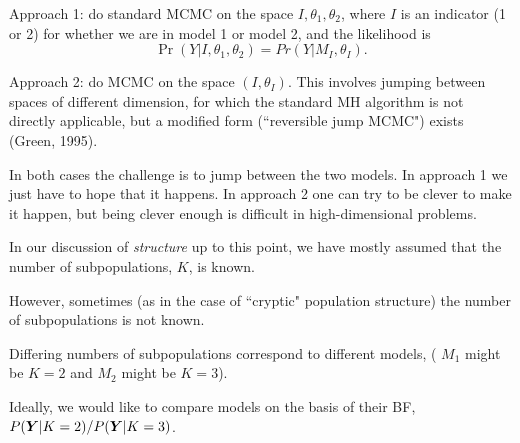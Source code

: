 
Approach 1: do standard MCMC on the space $I, \theta_1, \theta_2$, where $I$ is an indicator (1 or 2) for
whether we are in model 1 or model 2, and the likelihood is
$$\Pr(Y | I, \theta_1, \theta_2) = Pr(Y | M_I, \theta_I).$$
 
 Approach 2: do MCMC on the space $(I,\theta_I)$. This involves jumping between
 spaces of different dimension, for which the standard MH algorithm is not directly applicable,
 but a modified form (``reversible jump MCMC") exists (Green, 1995).
 
 In both cases the challenge is to jump between the two models. In approach 1 we just have
 to hope that it happens. In approach 2 one can try to be clever to make it happen, but being
 clever enough is difficult in high-dimensional problems.
 
In our discussion of {\em structure} up to this point, we have mostly assumed that the number of subpopulations, $K$, is known.  

However, sometimes (as in the case of ``cryptic" population structure) the number of subpopulations is not known.  

Differing numbers of subpopulations correspond to different models, (\ie\mbox{} $M_1$ might be $K=2$ and $M_2$ might be $K=3$).  

Ideally, we would like to compare models on the basis of their BF, $P(\bY | K=2) / P(\bY | K=3)$.


